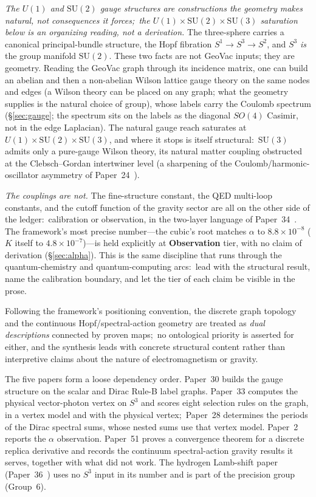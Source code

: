 \documentclass[aps,pra,twocolumn,superscriptaddress,longbibliography]{revtex4-2}
\newcommand{\gvc}[2]{#2}
\begin{document}
\emph{The $U(1)$ and $\mathrm{SU}(2)$ gauge structures are constructions the geometry makes natural, not consequences it forces;\ the $U(1)\times\mathrm{SU}(2)\times\mathrm{SU}(3)$ saturation below is an organizing reading, not a derivation.}  The three-sphere
carries a canonical principal-bundle structure, the Hopf fibration
$S^1\!\to\!S^3\!\to\!S^2$, and $S^3$ \emph{is} the group manifold
$\mathrm{SU}(2)$.  These two facts are not GeoVac inputs; they are
geometry.  Reading the GeoVac graph through its incidence matrix, one
can build an abelian and then a non-abelian Wilson lattice gauge theory
on the same nodes and edges (a Wilson theory can be placed on any graph;
what the geometry supplies is the natural choice of group), whose labels carry the Coulomb spectrum
(\S\ref{sec:gauge}; \gvc{graph-s3-wall}{the spectrum sits on the labels as the diagonal
$SO(4)$ Casimir, not in the edge Laplacian}).  The natural gauge reach saturates at
$U(1)\times\mathrm{SU}(2)\times\mathrm{SU}(3)$, and where it stops is
itself structural:\ $\mathrm{SU}(3)$ admits only a pure-gauge Wilson
theory, its natural matter coupling obstructed at the Clebsch--Gordan
intertwiner level (a sharpening of the Coulomb/harmonic-oscillator
asymmetry of Paper~24~\cite{loutey_paper24}).

\emph{The couplings are not.}  The fine-structure constant, the QED
multi-loop constants, and the cutoff function of the gravity sector are
all on the other side of the ledger:\ calibration or observation, in the
two-layer language of Paper~34~\cite{loutey_paper34}.  The framework's
most precise number---\gvc{k-match-precision}{the cubic's root matches $\alpha$ to
$8.8\times10^{-8}$ ($K$ itself to $4.8\times10^{-7}$)---is held
explicitly at \textbf{Observation} tier}, with no claim of derivation
(\S\ref{sec:alpha}).  This is the same discipline that runs through the
quantum-chemistry and quantum-computing arcs:\ lead with the structural
result, name the calibration boundary, and let the tier of each claim be
visible in the prose.

Following the framework's positioning convention, the discrete graph
topology and the continuous Hopf/spectral-action geometry are treated as
\emph{dual descriptions} connected by proven maps;\ no ontological
priority is asserted for either, and the synthesis leads with concrete
structural content rather than interpretive claims about the nature of
electromagnetism or gravity.

The five papers form a loose dependency order.  Paper~30 builds the
gauge structure on the scalar and Dirac Rule-B label graphs.  Paper~33
computes the physical vector-photon vertex on $S^3$ and scores eight
selection rules on the graph, in a vertex model and with the physical
vertex;\ Paper~28 determines the periods of the Dirac spectral sums,
whose nested sums use that vertex model.  Paper~2 reports
the $\alpha$ observation.  Paper~51 proves a convergence theorem for a
discrete replica derivative and records the continuum spectral-action
gravity results it serves, together with what did not work.  The
hydrogen Lamb-shift paper (Paper~36~\cite{loutey_paper36}) uses no $S^3$
input in its number and is part of the precision group (Group~6).
\end{document}
